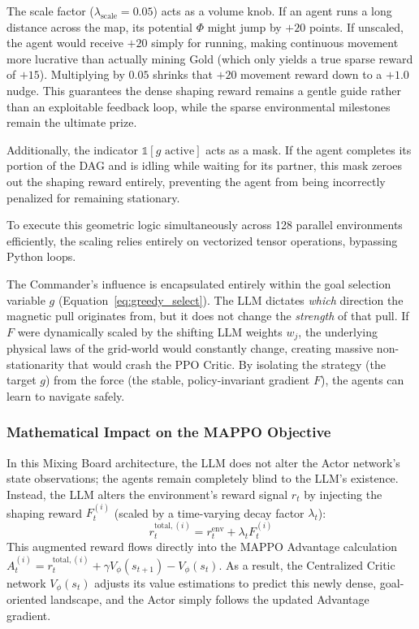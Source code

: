 The scale factor ($\lambda_{\text{scale}} = 0.05$) acts as a volume knob. If an agent runs a long distance across the map, its potential $\Phi$ might jump by $+20$ points. If unscaled, the agent would receive $+20$ simply for running, making continuous movement more lucrative than actually mining Gold (which only yields a true sparse reward of $+15$). Multiplying by $0.05$ shrinks that $+20$ movement reward down to a $+1.0$ nudge. This guarantees the dense shaping reward remains a gentle guide rather than an exploitable feedback loop, while the sparse environmental milestones remain the ultimate prize.

Additionally, the indicator $\mathds{1}[g \text{ active}]$ acts as a mask. If the agent completes its portion of the DAG and is idling while waiting for its partner, this mask zeroes out the shaping reward entirely, preventing the agent from being incorrectly penalized for remaining stationary.

To execute this geometric logic simultaneously across 128 parallel environments efficiently, the scaling relies entirely on vectorized tensor operations, bypassing Python loops.

The Commander's influence is encapsulated entirely within the goal selection variable $g$ (Equation~\ref{eq:greedy_select}). The LLM dictates \emph{which} direction the magnetic pull originates from, but it does not change the \emph{strength} of that pull. If $F$ were dynamically scaled by the shifting LLM weights $w_j$, the underlying physical laws of the grid-world would constantly change, creating massive non-stationarity that would crash the PPO Critic. By isolating the strategy (the target $g$) from the force (the stable, policy-invariant gradient $F$), the agents can learn to navigate safely.

\subsubsection{Mathematical Impact on the MAPPO Objective}
\label{sec:dyn_math_impact}

In this Mixing Board architecture, the LLM does not alter the Actor network's state observations; the agents remain completely blind to the LLM's existence. Instead, the LLM alters the environment's reward signal $r_t$ by injecting the shaping reward $F_t^{(i)}$ (scaled by a time-varying decay factor $\lambda_t$):
\begin{equation}
\label{eq:total_reward}
    r_t^{\text{total}, (i)} = r_t^{\text{env}} + \lambda_t F_t^{(i)}
\end{equation}
This augmented reward flows directly into the MAPPO Advantage calculation $A_t^{(i)} = r_t^{\text{total}, (i)} + \gamma V_\phi(s_{t+1}) - V_\phi(s_t)$. As a result, the Centralized Critic network $V_\phi(s_t)$ adjusts its value estimations to predict this newly dense, goal-oriented landscape, and the Actor simply follows the updated Advantage gradient.


